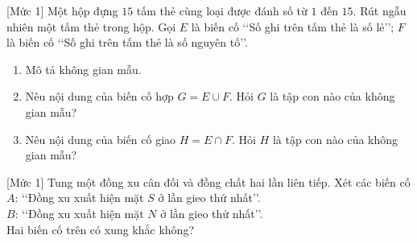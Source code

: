 \begin{bt}%
[Mức 1]
	Một hộp đựng $15$ tấm thẻ cùng loại được đánh số từ $1$ đến $15$. Rút ngẫu nhiên một tấm thẻ trong hộp. Gọi $E$ là biến cố \lq\lq Số ghi trên tấm thẻ là số lẻ\rq\rq; $F$ là biến cố \lq\lq Số ghi trên tấm thẻ là số nguyên tố\rq\rq.
	\begin{enumerate}
		\item Mô tả không gian mẫu.
		\item Nêu nội dung của biến cố hợp $G = E\cup F$. Hỏi $G$ là tập con nào của không gian mẫu?
		\item Nêu nội dung của biến cố giao $H = E\cap F$. Hỏi $H$ là tập con nào của không gian mẫu?
	\end{enumerate}
\end{bt}

\begin{bt}%
[Mức 1]
	Tung một đồng xu cân đối và đồng chất hai lần liên tiếp. Xét các biến cố\\
	$A$: \lq\lq Đồng xu xuất hiện mặt $S$ ở lần gieo thứ nhất\rq\rq.\\
	$B$: \lq\lq Đồng xu xuất hiện mặt $N$ ở lần gieo thứ nhất\rq\rq.\\
	Hai biến cố trên có xung khắc không?
\end{bt}

